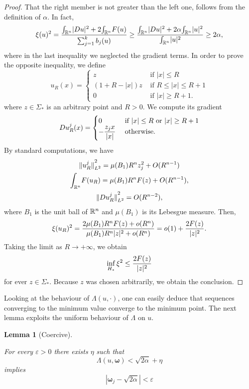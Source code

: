 \documentclass[a4paper,12pt,oneside]{amsart}
\newtheorem*{lemma*}{Lemma}
\theoremstyle{definition}
\theoremstyle{remark}
\theoremstyle{theorem}
\begin{document}
\begin{proof}
That the right member is not greater than the left one, follows
from the definition of $ \alpha $. In fact,
\[
\xi(u)\sp 2 = \frac{{\int_{{\mathbb{R}}\sp{n}}} |{D} u|\sp 2 + 2{\int_{{\mathbb{R}}\sp{n}}} {F}(u)}{\sum_{j = 1}\sp k b_j (u)}\geq 
\frac{{\int_{{\mathbb{R}}\sp{n}}} |{D} u|\sp 2 + 2\alpha {\int_{{\mathbb{R}}\sp{n}}} |u|\sp 2}{{\int_{{\mathbb{R}}\sp{n}}} |u|\sp 2}\geq 2\alpha,
\]
where in the last inequality we neglected the gradient terms.
In order to prove the opposite inequality, we define
\[
u_R (x) = 
\begin{cases}
{z} &\text{ if } |x|\leq R\\
(1 + R - |x|) {z}  & \text{ if } R\leq |x|\leq R + 1\\
0 & \text{ if } |x|\geq R + 1.
\end{cases}
\]
where $ {z}\in\Sigma_* $ is an arbitrary point and
$ R > 0 $. We compute its gradient
\[
{D} u_R \sp j (x) = 
\begin{cases}
0 & \text{ if } |x|\leq R \text{ or } |x| \geq R + 1\\
- \dfrac{{z}_j x}{|x|} & \text{ otherwise. }
\end{cases}
\]
By standard computations, we have
\begin{gather*}
{\|{u_R\sp j}\|}_{L\sp 2} \sp 2 = \mu(B_1) R\sp{n} {z}_j\sp 2 + 
O(R\sp{{n} - 1})\\
{\int_{{\mathbb{R}}\sp{n}}} {F}(u_R) = \mu(B_1) R\sp{n} {F}({z}) + O(R\sp{{n} - 1}),\\
{\|{{D} u_R\sp{j}}\|}_{L\sp 2} \sp 2 = O(R\sp{{n} - 2}),
\end{gather*}
where $ B_1 $ is the unit ball of $ {{\mathbb{R}}\sp{n}} $ and $ \mu(B_1) $ is its
Lebesgue measure. Then,
\[
\xi(u_R)\sp 2 = \frac{2\mu(B_1) R\sp{n}{F}({z}) + o(R\sp{n})}{\mu(B_1) R\sp{n} |{z}|\sp 2 + o(R\sp{n})} = 
o(1) + \frac{2{F}({z})}{|{z}|\sp 2}.
\]
Taking the limit as $ R{\rightarrow} +\infty $, we obtain
\[
\inf_{H_*} \xi\sp 2\leq \frac{2{F}({z})}{|{z}|\sp 2}
\]
for ever $ {z}\in\Sigma_* $. Because $ {z} $ was chosen arbitrarily,
we obtain the conclusion.
\end{proof}
Looking at the behaviour of $ \Lambda(u,\cdot) $,
one can easily deduce that sequences converging to the minimum value
converge to the minimum point. The next lemma exploits the uniform
behaviour of $ \Lambda $ on $ u $.
\begin{lemma*}[Coercive]
\hypertarget{lem:coercive}{}
For every $ {\varepsilon} > 0 $ there exists $ \eta $ such that 
\[
\Lambda(u,{\mathbf{\omega}}) < \sqrt{2\alpha} + \eta
\]
implies
\[
|{\mathbf{\omega}}_j - \sqrt{2\alpha}| < {\varepsilon}
\]
\end{lemma*}
\end{document}
